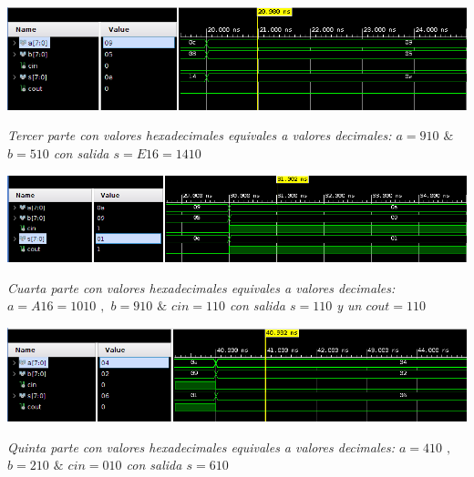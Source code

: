 \documentclass[12pt,executivepaper]{article}
\begin{document}
\begin{flushleft}
	\includegraphics[scale=0.52]{imgs/tercera.png}
\end{flushleft}
\begin{center}
    \textit{Tercer parte con valores hexadecimales equivales a valores decimales: $a=9{\scriptscriptstyle10}$ $\&$ $b=5{\scriptscriptstyle10}$ con salida $s = E{\scriptscriptstyle16}= 14{\scriptscriptstyle10}$}
\end{center}


\begin{flushleft}
	\includegraphics[scale=0.47]{imgs/cuarta.png}
\end{flushleft}
\begin{center}
    \textit{Cuarta parte con valores hexadecimales equivales a valores decimales: $a=A{\scriptscriptstyle16}=10{\scriptscriptstyle10}$ $,$ $b=9{\scriptscriptstyle10}$ $\&$ $cin=1{\scriptscriptstyle10}$ con salida $s =1{\scriptscriptstyle10}$ y un $cout=1{\scriptscriptstyle10}$}
\end{center}

\begin{flushleft}
	\includegraphics[scale=0.5]{imgs/quinta.png}
\end{flushleft}
\begin{center}
    \textit{Quinta parte con valores hexadecimales equivales a valores decimales: $a=4{\scriptscriptstyle10}$ $,$ $b=2{\scriptscriptstyle10}$ $\&$ $cin=0{\scriptscriptstyle10}$ con salida $s = 6{\scriptscriptstyle10}$}
\end{center}
\end{document}
